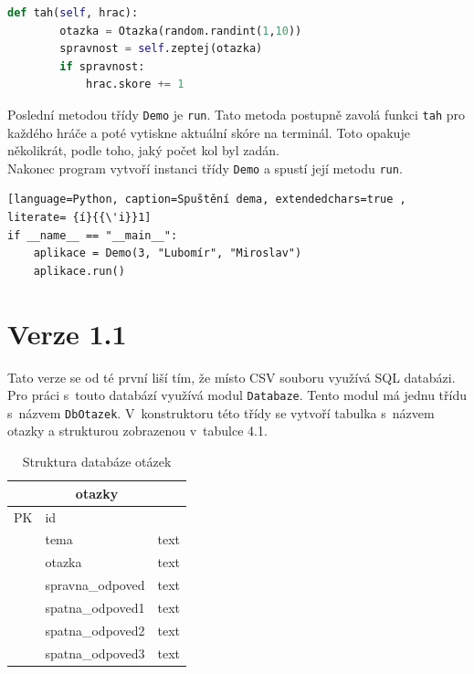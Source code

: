 \documentclass[12pt]{report}
\begin{document}
\begin{lstlisting}[language=Python, caption=Metoda \texttt{tah}, extendedchars=true]
def tah(self, hrac):
        otazka = Otazka(random.randint(1,10))
        spravnost = self.zeptej(otazka)
        if spravnost:
            hrac.skore += 1
\end{lstlisting}

Poslední metodou třídy \texttt{Demo} je \texttt{run}. Tato metoda postupně zavolá funkci \texttt{tah} pro každého hráče a poté vytiskne aktuální skóre na terminál. Toto opakuje několikrát, podle toho, jaký počet kol byl zadán.\\

Nakonec program vytvoří instanci třídy \texttt{Demo} a spustí její metodu \texttt{run}.
\begin{lstlisting}[language=Python, caption=Spuštění dema, extendedchars=true , literate= {í}{{\'i}}1]
if __name__ == "__main__":
    aplikace = Demo(3, "Lubomír", "Miroslav")
    aplikace.run()
\end{lstlisting}

\section{Verze 1.1}
Tato verze se od té první liší tím, že místo CSV souboru využívá SQL databázi. Pro práci s~touto databází využívá modul \texttt{Databaze}. Tento modul má jednu třídu s~názvem \texttt{DbOtazek}. V~konstruktoru této třídy se vytvoří tabulka s~názvem otazky a strukturou zobrazenou v~tabulce 4.1.\

\begin{table}[h]
\begin{center}
 		\caption{Struktura databáze otázek}
\begin{tabular}{ |p{1cm}|p{3cm}|p{1cm}|  }
 \hline
 \multicolumn{3}{|c|}{otazky} \\
 \hline
 PK& id & \\
 & tema    &text\\
 &otazka  &text   \\
 &spravna\_odpoved &text\\
 &spatna\_odpoved1 &text\\
 &spatna\_odpoved2&text  \\
 &spatna\_odpoved3&text   \\
 \hline
\end{tabular}
\end{center}
\end{table}
\end{document}
